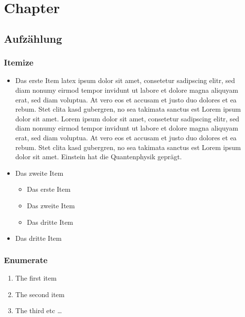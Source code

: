 \chapter{Chapter}
\thispagestyle{main} %
\section{Aufzählung}
\subsection{Itemize}
\begin{itemize}
\item Das erste Item
\Gls{latex} ipsum dolor sit amet, consetetur sadipscing elitr, sed diam nonumy eirmod tempor invidunt ut labore et dolore magna aliquyam erat, sed diam voluptua. At vero eos et accusam et justo duo dolores et ea rebum. Stet clita kasd gubergren, no sea takimata sanctus est Lorem ipsum dolor sit amet. Lorem ipsum dolor sit amet, consetetur sadipscing elitr, sed diam nonumy eirmod tempor invidunt ut labore et dolore magna aliquyam erat, sed diam voluptua. At vero eos et accusam et justo duo dolores et ea rebum. Stet clita kasd gubergren, no sea takimata sanctus est Lorem ipsum dolor sit amet. Einstein \cite{einstein} hat die Quantenphysik geprägt.
\item Das zweite Item
\begin{itemize}
\item Das erste Item
\item Das zweite Item
\item Das dritte Item
\end{itemize}
\item Das dritte Item
\end{itemize}

\subsection{Enumerate}
\begin{enumerate}
  \item The first item
  \item The second item
  \item The third etc \ldots
\end{enumerate}

